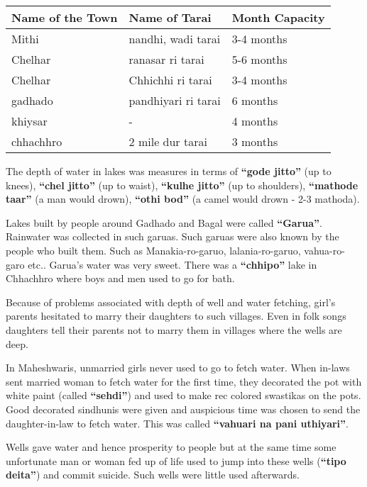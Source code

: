 \begin{center}
\begin{tabular}{l|l|l}
\hline
\textbf{Name of the Town} & \textbf{Name of Tarai} & \textbf{Month Capacity} \\
\hline
Mithi & nandhi, wadi tarai & 3-4 months \\ 
Chelhar & ranasar ri tarai & 5-6 months \\ 
Chelhar & Chhichhi ri tarai & 3-4 months \\ 
gadhado & pandhiyari ri tarai & 6 months \\ 
khiysar & - & 4 months \\ 
chhachhro & 2 mile dur tarai & 3 months \\ 
\hline
\end{tabular}
\end{center}

The depth of water in lakes was measures in terms of \textbf{``gode jitto''}
(up to knees), \textbf{``chel jitto''} (up to waist), \textbf{``kulhe jitto''}
(up to shoulders), \textbf{``mathode taar''} (a man would drown), \textbf{``othi
bod''} (a camel would drown - 2-3 mathoda).

Lakes built by people around Gadhado and Bagal were called \textbf{``Garua''}.
Rainwater was collected in such garuas. Such garuas were also known by the
people who built them. Such as Manakia-ro-garuo, lalania-ro-garuo, vahua-ro-garo
etc.. Garua's water was very sweet. There was a \textbf{``chhipo''} lake in
Chhachhro where boys and men used to go for bath.

Because of problems associated with depth of well and water fetching, girl's
parents hesitated to marry their daughters to such villages. Even in folk songs
daughters tell their parents not to marry them in villages where the wells are
deep.

In Maheshwaris, unmarried girls never used to go to fetch water. When in-laws
sent married woman to fetch water for the first time, they decorated the pot
with white paint (called \textbf{``sehdi''}) and used to make rec colored
swastikas on the pots. Good decorated sindhunis were given and auspicious time
was chosen to send the daughter-in-law to fetch water. This was called
\textbf{``vahuari na pani uthiyari''}.

Wells gave water and hence prosperity to people but at the same time some
unfortunate man or woman fed up of life used to jump into these wells
(\textbf{``tipo deita''}) and commit suicide. Such wells were little used
afterwards.

